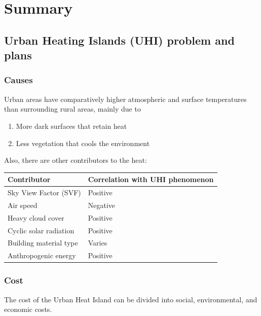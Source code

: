 \documentclass[
  letterpaper,
  DIV=11,
  numbers=noendperiod]{scrreprt}
\providecommand{\tightlist}{%
  \setlength{\itemsep}{0pt}\setlength{\parskip}{0pt}}\usepackage{longtable,booktabs,array}
\begin{document}
\hypertarget{summary-6}{%
\section{Summary}\label{summary-6}}

\hypertarget{urban-heating-islands-uhi-problem-and-plans}{%
\subsection{Urban Heating Islands (UHI) problem and
plans}\label{urban-heating-islands-uhi-problem-and-plans}}

\hypertarget{causes}{%
\subsubsection{Causes}\label{causes}}

Urban areas have comparatively higher atmospheric and surface
temperatures than surrounding rural areas, mainly due to

\begin{enumerate}
\def\labelenumi{\arabic{enumi}.}
\tightlist
\item
  More dark surfaces that retain heat
\item
  Less vegetation that cools the environment
\end{enumerate}

Also, there are other contributors to the heat:

\begin{longtable}[]{@{}ll@{}}
\toprule()
Contributor & Correlation with UHI phenomenon \\
\midrule()
\endhead
Sky View Factor (SVF) & Positive \\
Air speed & Negative \\
Heavy cloud cover & Positive \\
Cyclic solar radiation & Positive \\
Building material type & Varies \\
Anthropogenic energy & Positive \\
\bottomrule()
\end{longtable}

\hypertarget{cost}{%
\subsubsection{Cost}\label{cost}}

The cost of the Urban Heat Island can be divided into social,
environmental, and economic costs.
\end{document}

